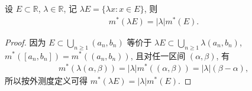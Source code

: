 \documentclass[../../main.tex]{subfiles}%
\begin{document}
\begin{theorem}[外测度的数乘]\label{theorem:外测度的数乘}
设 \(E \subset \mathbb{R}\), \(\lambda \in \mathbb{R}\), 记 \(\lambda E = \{ \lambda x : x \in E\}\), 则
\begin{align*}
m^*(\lambda E) = |\lambda| m^*(E).
\end{align*}
\end{theorem}
\begin{proof}
因为 \(E \subset \bigcup_{n \geqslant  1} (a_n, b_n)\) 等价于 \(\lambda E \subset \bigcup_{n \geqslant  1} \lambda (a_n, b_n)\), \(m^*([a_n, b_n]) = m^*((a_n, b_n))\), 且对任一区间 \((\alpha, \beta)\), 有
\begin{align*}
m^*(\lambda (\alpha, \beta)) = |\lambda| m^*((\alpha, \beta)) = |\lambda| (\beta - \alpha),
\end{align*}
所以按外测度定义可得 \(m^*(\lambda E) = |\lambda| m^*(E)\). 
\end{proof}
\end{document}
